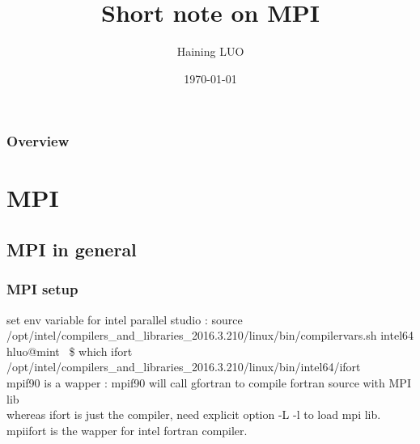 \documentclass{beamer}
\title[Short title]{Short note on MPI} %
\author{Haining LUO} %
\institute[] %
{
ECL \\ %
\medskip
\textit{haining.luo@doctorant.ec-lyon.fr} %
}
\date{\today} %
\begin{document}
\begin{frame}
\titlepage %
\end{frame}

\begin{frame}
\frametitle{Overview} %
\tableofcontents %
\end{frame}

\section{MPI} %

\subsection{MPI in general} %

\begin{frame}
\frametitle{MPI setup}

set env variable for intel parallel studio : 
source /opt/intel/compilers\_and\_libraries\_2016.3.210/linux/bin/compilervars.sh intel64 \\

hluo@mint ~\$ which ifort \\
/opt/intel/compilers\_and\_libraries\_2016.3.210/linux/bin/intel64/ifort \\

mpif90 is a wapper :  mpif90 will call gfortran to compile fortran source with MPI lib \\

whereas ifort is just the compiler, need explicit option -L -l to load mpi lib. \\

mpiifort is the wapper for intel fortran compiler.

\end{frame}
\end{document}
